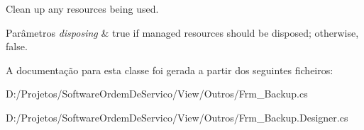 Clean up any resources being used. 


\begin{DoxyParams}{Parâmetros}
{\em disposing} & true if managed resources should be disposed; otherwise, false.\\
\hline
\end{DoxyParams}


A documentação para esta classe foi gerada a partir dos seguintes ficheiros\+:\begin{DoxyCompactItemize}
\item 
D\+:/\+Projetos/\+Software\+Ordem\+De\+Servico/\+View/\+Outros/Frm\+\_\+\+Backup.\+cs\item 
D\+:/\+Projetos/\+Software\+Ordem\+De\+Servico/\+View/\+Outros/Frm\+\_\+\+Backup.\+Designer.\+cs\end{DoxyCompactItemize}
